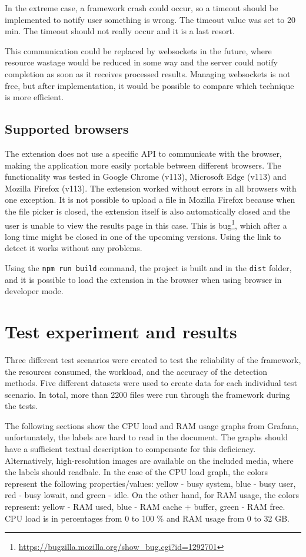 In the extreme case, a framework crash could occur, so a timeout should be implemented to notify user something is wrong. The timeout value was set to 20 min. The timeout should not really occur and it is a last resort.

This communication could be replaced by websockets in the future, where resource wastage would be reduced in some way and the server could notify completion as soon as it receives processed results. Managing websockets is not free, but after implementation, it would be possible to compare which technique is more efficient. 

\section{Supported browsers}

The extension does not use a specific API to communicate with the browser, making the application more easily portable between different browsers. The functionality was tested in Google Chrome (v113), Microsoft Edge (v113) and Mozilla Firefox (v113). The extension worked without errors in all browsers with one exception. It is not possible to upload a file in Mozilla Firefox because when the file picker is closed, the extension itself is also automatically closed and the user is unable to view the results page in this case. This is bug\footnote{\url{https://bugzilla.mozilla.org/show_bug.cgi?id=1292701}}, which after a long time might be closed in one of the upcoming versions. Using the link to detect it works without any problems. 

Using the \texttt{npm run build} command, the project is built and in the \texttt{dist} folder, and it is possible to load the extension in the browser when using browser in developer mode.

\chapter{Test experiment and results}

Three different test scenarios were created to test the reliability of the framework, the resources consumed, the workload, and the accuracy of the detection methods. Five different datasets were used to create data for each individual test scenario. In total, more than 2200 files were run through the framework during the tests.

The following sections show the CPU load and RAM usage graphs from Grafana, unfortunately, the labels are hard to read in the document. The graphs should have a sufficient textual description to compensate for this deficiency. Alternatively, high-resolution images are available on the included media, where the labels should readbale. In the case of the CPU load graph, the colors represent the following properties/values: yellow - busy system, blue - busy user, red - busy lowait, and green - idle. On the other hand, for RAM usage, the colors represent: yellow - RAM used, blue - RAM cache + buffer, green - RAM free. CPU load is in percentages from 0 to 100 \% and RAM usage from 0 to 32 GB.

